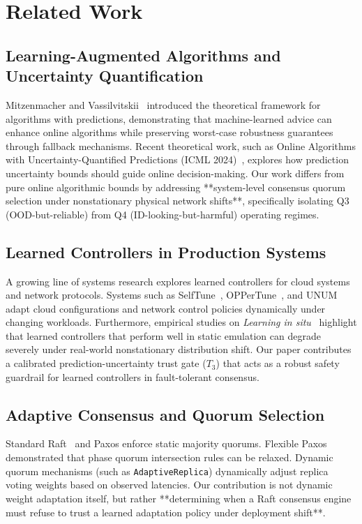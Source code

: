 \section{Related Work}
\label{sec:related}

\subsection{Learning-Augmented Algorithms and Uncertainty Quantification}
Mitzenmacher and Vassilvitskii~\cite{mitzenmacher2022algorithms} introduced the theoretical framework for algorithms with predictions, demonstrating that machine-learned advice can enhance online algorithms while preserving worst-case robustness guarantees through fallback mechanisms. Recent theoretical work, such as Online Algorithms with Uncertainty-Quantified Predictions (ICML 2024)~\cite{icml2024uncertainty}, explores how prediction uncertainty bounds should guide online decision-making. Our work differs from pure online algorithmic bounds by addressing **system-level consensus quorum selection under nonstationary physical network shifts**, specifically isolating Q3 (OOD-but-reliable) from Q4 (ID-looking-but-harmful) operating regimes.

\subsection{Learned Controllers in Production Systems}
A growing line of systems research explores learned controllers for cloud systems and network protocols. Systems such as SelfTune~\cite{selftune2023}, OPPerTune~\cite{oppertune2024}, and UNUM~\cite{unum2024} adapt cloud configurations and network control policies dynamically under changing workloads. Furthermore, empirical studies on \emph{Learning in situ}~\cite{learninginsitu2023} highlight that learned controllers that perform well in static emulation can degrade severely under real-world nonstationary distribution shift. Our paper contributes a calibrated prediction-uncertainty trust gate ($T_3$) that acts as a robust safety guardrail for learned controllers in fault-tolerant consensus.

\subsection{Adaptive Consensus and Quorum Selection}
Standard Raft~\cite{ongaro2014search} and Paxos enforce static majority quorums. Flexible Paxos~\cite{howard2016flexible} demonstrated that phase quorum intersection rules can be relaxed. Dynamic quorum mechanisms (such as \texttt{AdaptiveReplica}) dynamically adjust replica voting weights based on observed latencies. Our contribution is not dynamic weight adaptation itself, but rather **determining when a Raft consensus engine must refuse to trust a learned adaptation policy under deployment shift**.
